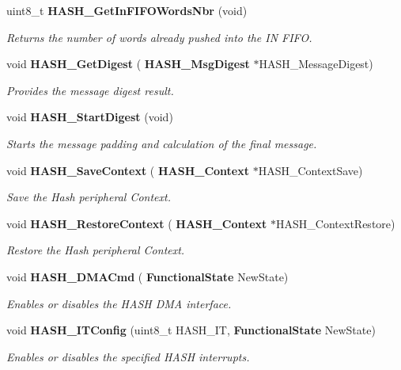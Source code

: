 \begin{DoxyCompactItemize}
uint8\+\_\+t \textbf{ H\+A\+S\+H\+\_\+\+Get\+In\+F\+I\+F\+O\+Words\+Nbr} (void)
\begin{DoxyCompactList}\small\item\em Returns the number of words already pushed into the IN F\+I\+FO. \end{DoxyCompactList}\item 
void \textbf{ H\+A\+S\+H\+\_\+\+Get\+Digest} (\textbf{ H\+A\+S\+H\+\_\+\+Msg\+Digest} $\ast$H\+A\+S\+H\+\_\+\+Message\+Digest)
\begin{DoxyCompactList}\small\item\em Provides the message digest result. \end{DoxyCompactList}\item 
void \textbf{ H\+A\+S\+H\+\_\+\+Start\+Digest} (void)
\begin{DoxyCompactList}\small\item\em Starts the message padding and calculation of the final message. \end{DoxyCompactList}\item 
void \textbf{ H\+A\+S\+H\+\_\+\+Save\+Context} (\textbf{ H\+A\+S\+H\+\_\+\+Context} $\ast$H\+A\+S\+H\+\_\+\+Context\+Save)
\begin{DoxyCompactList}\small\item\em Save the Hash peripheral Context. \end{DoxyCompactList}\item 
void \textbf{ H\+A\+S\+H\+\_\+\+Restore\+Context} (\textbf{ H\+A\+S\+H\+\_\+\+Context} $\ast$H\+A\+S\+H\+\_\+\+Context\+Restore)
\begin{DoxyCompactList}\small\item\em Restore the Hash peripheral Context. \end{DoxyCompactList}\item 
void \textbf{ H\+A\+S\+H\+\_\+\+D\+M\+A\+Cmd} (\textbf{ Functional\+State} New\+State)
\begin{DoxyCompactList}\small\item\em Enables or disables the H\+A\+SH D\+MA interface. \end{DoxyCompactList}\item 
void \textbf{ H\+A\+S\+H\+\_\+\+I\+T\+Config} (uint8\+\_\+t H\+A\+S\+H\+\_\+\+IT, \textbf{ Functional\+State} New\+State)
\begin{DoxyCompactList}\small\item\em Enables or disables the specified H\+A\+SH interrupts. \end{DoxyCompactList}\item 

\end{DoxyCompactItemize}
